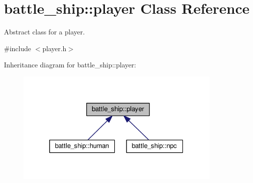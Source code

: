 \hypertarget{classbattle__ship_1_1player}{}\section{battle\+\_\+ship\+:\+:player Class Reference}
\label{classbattle__ship_1_1player}


Abstract class for a player.  




{\ttfamily \#include $<$player.\+h$>$}



Inheritance diagram for battle\+\_\+ship\+:\+:player\+:
\nopagebreak
\begin{figure}[H]
\begin{center}
\leavevmode
\includegraphics[width=284pt]{classbattle__ship_1_1player__inherit__graph}
\end{center}
\end{figure}
